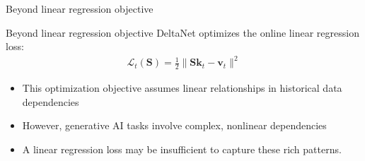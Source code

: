 

\begin{frame}{}
    \centering
    \LARGE
     Beyond linear regression objective
\end{frame}


\begin{frame}{Beyond linear regression objective}
      DeltaNet optimizes the online linear regression loss:
    \begin{align*}
      \mathcal{L}_t(\mathbf{S}) = \frac{1}{2}\|\mathbf{S} \mathbf{k}_t - \mathbf{v}_t\|^2
    \end{align*}
    \begin{itemize}
        \item This optimization objective assumes linear relationships in historical data dependencies
        \item However, generative AI tasks involve complex, nonlinear dependencies
        \item A linear regression loss may be insufficient to capture these rich patterns.
    \end{itemize}
  \end{frame}

